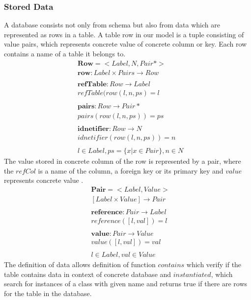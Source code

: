 \documentclass[11pt]{article}
\begin{document}
\subsubsection{Stored Data} 
A database consists not only from schema but also from data which are represented as rows in a table. A table row in our model is a tuple consisting of value pairs, which represents concrete value of concrete column or key. Each row contains a name of a table it belongs to.
\begin{align*}
&	\mathbf{Row} = < Label, N, Pair* > \\
&	\mathbf{row} : Label \times Pairs \rightarrow Row \\ \\
&	\mathbf{refTable} : Row \rightarrow Label \\
&	refTable(row(l, n, ps) = l \\ \\
&	\mathbf{pairs} : Row \rightarrow Pair* \\
&	pairs(row(l, n, ps)) = ps \\ \\
&	\mathbf{idnetifier} : Row \rightarrow N \\
&	idnetifier(row(l, n, ps)) = n \\ \\
&	 l \in Label, ps = \{ x | x \in Pair\}, n \in N
\end{align*}
The value stored in concrete column of the row is represented by a pair, where the $refCol$ is a name of the column, a foreign key or its primary key and $value$ represents concrete value .
\begin{align*}
&	\mathbf{Pair} = < Label, Value > \\
&	[Label \times Value] \rightarrow Pair\\ \\
&	\mathbf{reference} : Pair \rightarrow Label \\
&	reference([l,val]) = l \\ \\
&	\mathbf{value} : Pair \rightarrow Value \\ 
&	value([l,val]) = val \\ \\
&	l \in Label, val \in Value
\end{align*}
The definition of data allows definition of function $contains$ which verify if the table contains data in context of concrete database and $instantiated$, which search for instances of a class with given name and returns true if there are rows for the table in the database.
\end{document}
